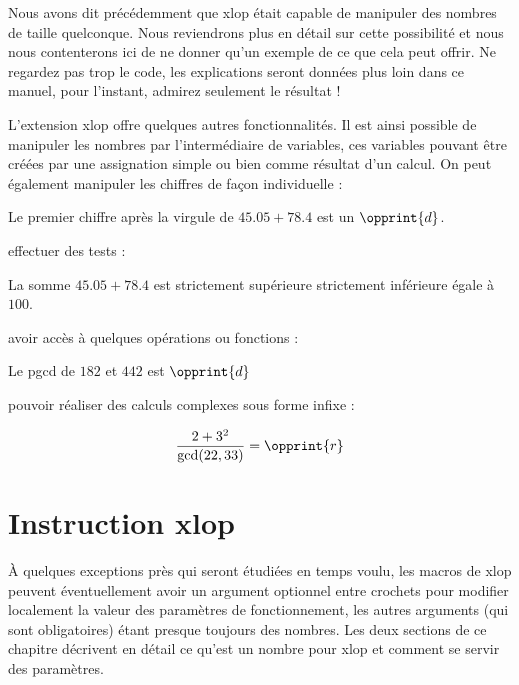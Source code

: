 \documentclass[12pt]{report}
\newcommand\package[1]{\textsf{#1}}
\begin{document}
Nous avons dit précédemment que \package{xlop} était capable de
manipuler des nombres de taille quelconque. Nous reviendrons plus en
détail sur cette possibilité et nous nous contenterons ici de ne donner
qu'un exemple de ce que cela peut offrir. Ne regardez pas trop le
code, les explications seront données plus loin dans ce manuel, pour
l'instant, admirez seulement le résultat !
\begin{CenterExample}[xrightmargin=0pt]
\end{CenterExample}

L'extension \package{xlop} offre quelques autres fonctionnalités. Il
est ainsi possible de manipuler les nombres par l'intermédiaire de
variables, ces variables pouvant être créées par une assignation
simple ou bien comme résultat d'un calcul. On peut également manipuler
les chiffres de façon individuelle :
\begin{SideBySideExample}
  Le premier chiffre apr\`es la
  virgule de $45.05+78.4$ est un
  $\opprint{d}$.
\end{SideBySideExample}
effectuer des tests :
\begin{SideBySideExample}
  La somme $45.05+78.4$ est
  \ifopgt strictement sup\'erieure
  \else\ifoplt strictement inf\'erieure
  \else \'egale
  \fi\fi
  \`a $100$.
\end{SideBySideExample}
avoir accès à quelques opérations ou fonctions :
\begin{SideBySideExample}
  Le pgcd de $182$ et $442$ est
  $\opprint{d}$
\end{SideBySideExample}
pouvoir réaliser des calculs complexes sous forme infixe :
\begin{SideBySideExample}
  $$\frac{2+3^2}{\gcd(22,33)} =
    \opprint{r}$$
\end{SideBySideExample}

\chapter{Instruction \package{xlop}}
\`A quelques exceptions près qui seront étudiées en temps voulu, les
macros de \package{xlop} peuvent éventuellement avoir un argument
optionnel entre crochets pour modifier localement la valeur des
paramètres de fonctionnement, les autres arguments (qui sont
obligatoires) étant presque toujours des nombres. Les deux sections de
ce chapitre décrivent en détail ce qu'est un nombre pour
\package{xlop} et comment se servir des paramètres.
\end{document}
